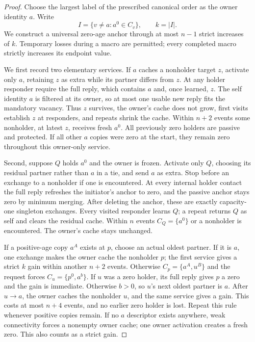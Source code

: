 \begin{proof}
Choose the largest label of the prescribed canonical order
as the owner identity $a$. Write
\[
 I=\{v\ne a:a^0\in C_v\},\qquad k=|I|.
\]
We construct a universal zero-age anchor through at most
$n-1$ strict increases of $k$. Temporary losses during a
macro are permitted; every completed macro strictly
increases its endpoint value.

We first record two elementary services. If $a$ caches
a nonholder target $z$, activate only $a$, retaining $z$
as extra while its partner differs from $z$. At any holder
responder require the full reply, which contains $a$ and,
once learned, $z$. The self identity $a$ is filtered at
its owner, so at most one usable new reply fits the
mandatory vacancy. Thus $z$ survives, the owner's cache
does not grow, first visits establish $z$ at responders,
and repeats shrink the cache. Within $n+2$ events some
nonholder, at latest $z$, receives fresh $a^0$.
All previously zero holders are passive and protected.
If all other $a$ copies were zero at the start, they
remain zero throughout this owner-only service.

Second, suppose $Q$ holds $a^0$ and the owner is frozen.
Activate only $Q$, choosing its residual partner rather
than $a$ in a tie, and send $a$ as extra. Stop before
an exchange to a nonholder if one is encountered.
At every internal holder contact the full reply refreshes
the initiator's anchor to zero, and the passive anchor
stays zero by minimum merging. After deleting the anchor,
these are exactly capacity-one singleton exchanges.
Every visited responder learns $Q$; a repeat returns
$Q$ as self and clears the residual cache.
Within $n$ events $C_Q=\{a^0\}$ or a nonholder is
encountered. The owner's cache stays unchanged.

If a positive-age copy $a^A$ exists at $p$, choose an
actual oldest partner. If it is $a$, one exchange makes
the owner cache the nonholder $p$; the first service gives
a strict $k$ gain within another $n+2$ events.
Otherwise $C_p=\{a^A,u^B\}$ and the request forces
$C_u=\{p^0,a^b\}$. If $u$ was a zero holder, its full
reply gives $p$ a zero and the gain is immediate.
Otherwise $b>0$, so $u$'s next oldest partner is $a$.
After $u\to a$, the owner caches the nonholder $u$,
and the same service gives a gain. This costs at most
$n+4$ events, and no earlier zero holder is lost.
Repeat this rule whenever positive copies remain.
If no $a$ descriptor exists anywhere, weak connectivity
forces a nonempty owner cache; one owner activation
creates a fresh zero. This also counts as a strict gain.


\end{proof}
